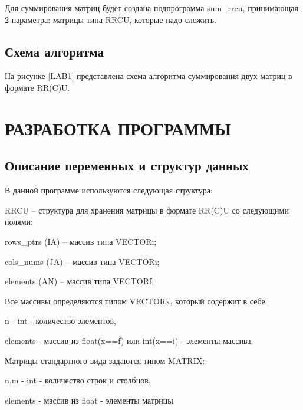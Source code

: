 Для суммирования матриц будет создана подпрограмма sum\_rrcu, принимающая 2 параметра: матрицы типа RRCU, которые надо сложить.

\subsection{Схема алгоритма}
На рисунке \ref{LAB1} представлена схема алгоритма суммирования двух матриц в формате RR(C)U.
\section{РАЗРАБОТКА ПРОГРАММЫ}
\subsection{Описание переменных и структур данных}
В данной программе используются следующая структура:

RRCU – структура для хранения матрицы в формате RR(C)U со следующими полями: 

rows\_ptrs (IA) – массив типа VECTORi;

cols\_nums (JA) – массив типа VECTORi;

elements (AN) – массив типа VECTORf;

Все массивы определяются типом VECTORx, который содержит в себе:

n - int - количество элементов,

elements - массив из float(x==f) или int(x==i) - элементы массива.

Матрицы стандартного вида задаются типом MATRIX:

n,m - int - количество строк и столбцов,

elements - массив из float - элементы матрицы.

